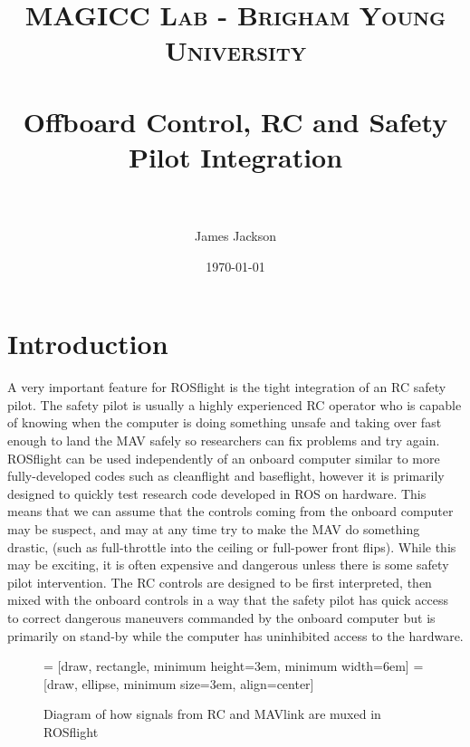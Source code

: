 \documentclass[paper=a4, fontsize=11pt]{scrartcl} %
\title{
\normalfont \normalsize
\textsc{MAGICC Lab - Brigham Young University} \\ [25pt] %
\horrule{0.5pt} \\[0.4cm] %
\huge Offboard Control, RC and Safety Pilot Integration \\ %
\horrule{2pt} \\[0.5cm] %
}
\author{James Jackson} %
\date{\normalsize\today} %
\begin{document}
\maketitle %


\section{Introduction}

A very important feature for ROSflight is the tight integration of an RC safety pilot.  The safety pilot is usually a highly experienced RC operator who is capable of knowing when the computer is doing something unsafe and taking over fast enough to land the MAV safely so researchers can fix problems and try again.  ROSflight can be used independently of an onboard computer similar to more fully-developed codes such as cleanflight and baseflight, however it is primarily designed to quickly test research code developed in ROS on hardware.  This means that we can assume that the controls coming from the onboard computer may be suspect, and may at any time try to make the MAV do something drastic, (such as full-throttle into the ceiling or full-power front flips).  While this may be exciting, it is often expensive and dangerous unless there is some safety pilot intervention.  The RC controls are designed to be first interpreted, then mixed with the onboard controls in a way that the safety pilot has quick access to correct dangerous maneuvers commanded by the onboard computer but is primarily on stand-by while the computer has uninhibited access to the hardware.

\begin{figure}
	\centering

	 = [draw, rectangle, 
    					minimum height=3em, minimum width=6em]
  =[draw, ellipse, minimum size=3em,
    					align=center]

  \begin{adjustbox}{max size={\textwidth}{0.2\textheight}}
  \end{adjustbox}

	\label{mux_configuration}
	\caption{Diagram of how signals from RC and MAVlink are muxed in ROSflight}
\end{figure}
\end{document}
